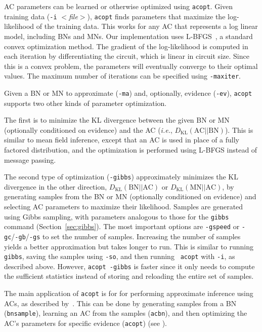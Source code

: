 \documentclass[11pt]{article}
\begin{document}
AC parameters can be learned or otherwise optimized using {\tt acopt}.
Given training data ({\tt -i} {\em $<$file$>$}), {\tt acopt} finds
parameters that maximize the log-likelihood of the training data.
This works for any AC that represents a log linear model, including
BNs and MNs.  Our implementation uses L-BFGS~\cite{liu&nocedal89}, a
standard convex optimization method.  The gradient of the
log-likelihood is computed in each iteration by differentiating the
circuit, which is linear in circuit size.  Since this is a convex
problem, the parameters will eventually converge to their optimal
values.  The maximum number of iterations can be specified using
{\tt -maxiter}.

Given a BN or MN to approximate ({\tt -ma}) and, optionally, evidence
({\tt -ev}), {\tt acopt} supports two other kinds of parameter
optimization.

The first is to minimize the KL divergence between the given BN or MN
(optionally conditioned on evidence) and the AC ({\em i.e.},
$D_{\text{KL}}(\text{AC}||\text{BN})$).  This is similar to mean field
inference, except that an AC is used in place of a fully factored
distribution, and the optimization is performed using L-BFGS instead
of message passing.

The second type of optimization ({\tt -gibbs}) approximately minimizes
the KL divergence in the other direction,
$D_{\text{KL}}(\text{BN}||\text{AC})$ or
$D_{\text{KL}}(\text{MN}||\text{AC})$, by generating samples from the
BN or MN (optionally conditioned on evidence) and selecting AC
parameters to maximize their likelihood.  Samples are generated using
Gibbs sampling, with parameters analogous to those for the {\tt gibbs}
command (Section~\ref{sec:gibbs}).  The most important options are
{\tt -gspeed} or {\tt -gc}/{\tt -gb}/{\tt -gs} to set the number of
samples.  Increasing the number of samples yields a better
approximation but takes longer to run.  This is similar to running
{\tt gibbs}, saving the samples using {\tt -so}, and then running {\tt
acopt} with {\tt -i}, as described above.  However, {\tt acopt -gibbs}
is faster since it only needs to compute the sufficient statistics
instead of storing and reloading the entire set of samples.

The main application of {\tt acopt} is for for performing approximate
inference using ACs, as described by~\cite{lowd&domingos10}.  This can
be done by generating samples from a BN ({\tt bnsample}), learning an
AC from the samples ({\tt acbn}), and then optimizing the AC's
parameters for specific evidence ({\tt acopt}) (see
\cite{lowd&domingos10}).
\end{document}

